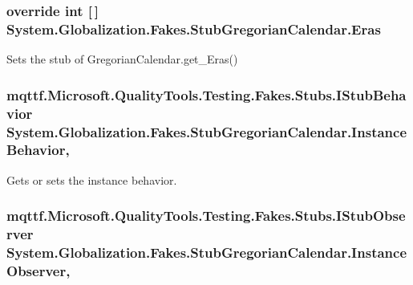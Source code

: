 \hypertarget{class_system_1_1_globalization_1_1_fakes_1_1_stub_gregorian_calendar_a9adc8bb8843e70760653451a851df18d}{
\subsubsection[{Eras}]{\setlength{\rightskip}{0pt plus 5cm}override int \mbox{[}$\,$\mbox{]} System.\-Globalization.\-Fakes.\-Stub\-Gregorian\-Calendar.\-Eras\hspace{0.3cm}{\ttfamily [get]}}}\label{class_system_1_1_globalization_1_1_fakes_1_1_stub_gregorian_calendar_a9adc8bb8843e70760653451a851df18d}


Sets the stub of Gregorian\-Calendar.\-get\-\_\-\-Eras()

\hypertarget{class_system_1_1_globalization_1_1_fakes_1_1_stub_gregorian_calendar_aa08b7fa40568132d21322b4e5f1ebbbb}{
\subsubsection[{Instance\-Behavior}]{\setlength{\rightskip}{0pt plus 5cm}mqttf.\-Microsoft.\-Quality\-Tools.\-Testing.\-Fakes.\-Stubs.\-I\-Stub\-Behavior System.\-Globalization.\-Fakes.\-Stub\-Gregorian\-Calendar.\-Instance\-Behavior\hspace{0.3cm}{\ttfamily [get]}, {\ttfamily [set]}}}\label{class_system_1_1_globalization_1_1_fakes_1_1_stub_gregorian_calendar_aa08b7fa40568132d21322b4e5f1ebbbb}


Gets or sets the instance behavior.

\hypertarget{class_system_1_1_globalization_1_1_fakes_1_1_stub_gregorian_calendar_a624a450a9a6ab1739f295f659f16c2ed}{
\subsubsection[{Instance\-Observer}]{\setlength{\rightskip}{0pt plus 5cm}mqttf.\-Microsoft.\-Quality\-Tools.\-Testing.\-Fakes.\-Stubs.\-I\-Stub\-Observer System.\-Globalization.\-Fakes.\-Stub\-Gregorian\-Calendar.\-Instance\-Observer\hspace{0.3cm}{\ttfamily [get]}, {\ttfamily [set]}}}\label{class_system_1_1_globalization_1_1_fakes_1_1_stub_gregorian_calendar_a624a450a9a6ab1739f295f659f16c2ed}


